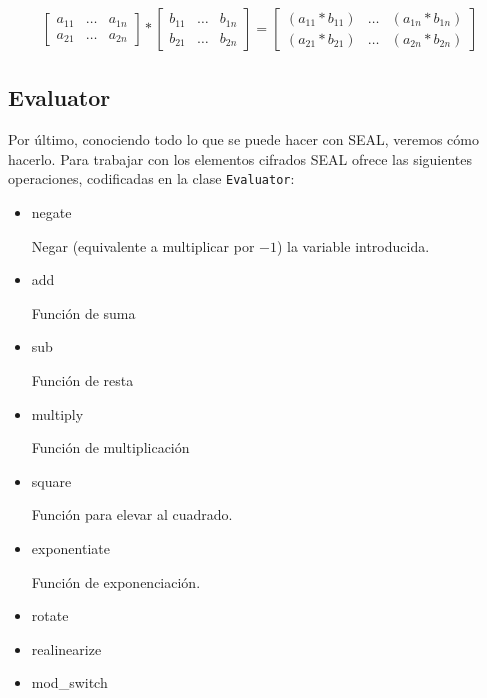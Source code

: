 \begin{gather}
    \begin{bmatrix}
        a_{11}  & \hdots    & a_{1n} \\
        a_{21}  & \hdots    & a_{2n}
    \end{bmatrix}
    *
    \begin{bmatrix}
        b_{11}  & \hdots    & b_{1n} \\
        b_{21}  & \hdots    & b_{2n}
    \end{bmatrix} 
    =
    \begin{bmatrix}
        (a_{11} * b_{11})    & \hdots    & (a_{1n} * b_{1n}) \\
        (a_{21} * b_{21})    & \hdots    & (a_{2n} * b_{2n})
    \end{bmatrix}
\end{gather}



\subsection{Evaluator}

Por último, conociendo todo lo que se puede hacer con SEAL, veremos cómo hacerlo. Para trabajar con los elementos cifrados SEAL ofrece las siguientes operaciones, codificadas en la clase \verb|Evaluator|:

\begin{itemize}
    \item negate
    
    Negar (equivalente a multiplicar por $-1$) la variable introducida.
    
    \item add
    
    Función de suma
    
    \item sub
    
    Función de resta
    
    \item multiply
    
    Función de multiplicación
    
    \item square
    
    Función para elevar al cuadrado.
    
    \item exponentiate
    
    Función de exponenciación.
    
    \item rotate
    
    
    
    \item realinearize
    
    
    
    \item mod\_switch
    
    
    
\end{itemize}

